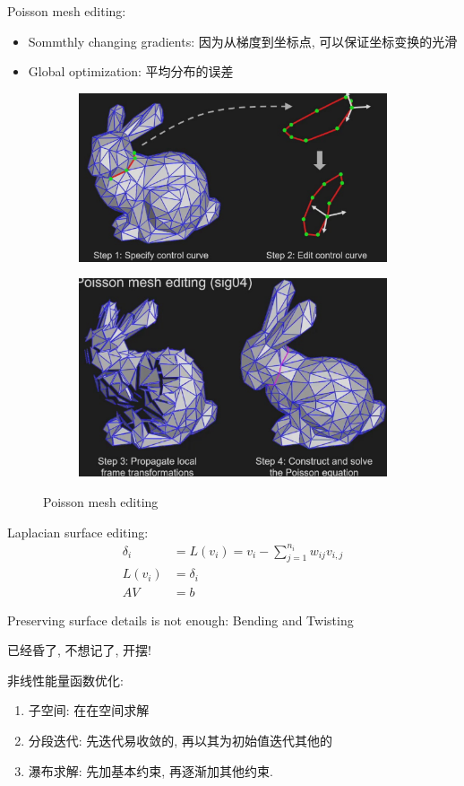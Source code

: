 Poisson mesh editing:
\begin{itemize}
    \item Sommthly changing gradients: 因为从梯度到坐标点, 可以保证坐标变换的光滑
    \item Global optimization: 平均分布的误差
\end{itemize}

\begin{figure}[!htb]
    \centering
    \begin{subfigure}{0.22\textwidth}
        \centering
        \includegraphics[height=0.54\textwidth]{pic/ACG6/Poisson mesh editing1.png}
    \end{subfigure}
    \begin{subfigure}{0.22\textwidth}
        \centering
        \includegraphics[height=0.54\textwidth]{pic/ACG6/Poisson mesh editing2.png}
    \end{subfigure}
    \caption{Poisson mesh editing}
\end{figure}

Laplacian surface editing:
\begin{align*}
    \delta_i&=L(v_i)=v_i-\sum_{j=1}^{n_i}w_{ij}v_{i,j}\\
    L(v_i)&=\delta_i\\
    AV&=b
\end{align*}

Preserving surface details is not enough: Bending and Twisting

已经昏了, 不想记了, 开摆!

非线性能量函数优化:
\begin{enumerate}
    \item 子空间: 在在空间求解
    \item 分段迭代: 先迭代易收敛的, 再以其为初始值迭代其他的
    \item 瀑布求解: 先加基本约束, 再逐渐加其他约束.
\end{enumerate}